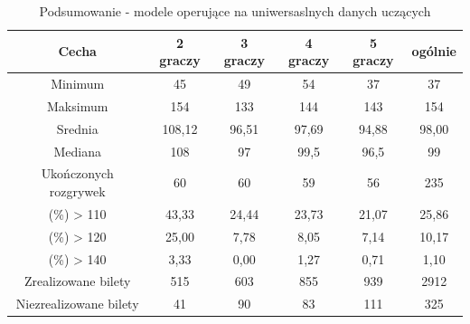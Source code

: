 \documentclass[12pt, oneside]{report}
\begin{document}
\begin{table}[h]
	\begin{center}
		\begin{tabular}{| c | c | c | c | c | c |} \hline
			Cecha & 2 graczy & 3 graczy & 4 graczy & 5 graczy & ogólnie \\ \hline
			Minimum & 45 & 49 & 54 & 37 & 37 \\ \hline
			Maksimum & 154 & 133 & 144 & 143 & 154 \\ \hline
			Srednia & 108,12 & 96,51 & 97,69 & 94,88 & 98,00 \\ \hline
			Mediana & 108 & 97 & 99,5 & 96,5 & 99 \\ \hline
			Ukończonych rozgrywek & 60 & 60 & 59 & 56 & 235 \\ \hline
			(\%) > 110 & 43,33 & 24,44 & 23,73 & 21,07 & 25,86 \\ \hline
			(\%) > 120 & 25,00 & 7,78 & 8,05 & 7,14 & 10,17 \\ \hline
			(\%) > 140 & 3,33 & 0,00 & 1,27 & 0,71 & 1,10 \\ \hline
			Zrealizowane bilety & 515 & 603 & 855 & 939 & 2912 \\ \hline
			Niezrealizowane bilety & 41 & 90 & 83 & 111 & 325 \\ \hline
		\end{tabular}
		\caption{Podsumowanie - modele operujące na uniwersaslnych danych uczących}
		\label{table:nn_all_test}
	\end{center}
\end{table}
\end{document}
